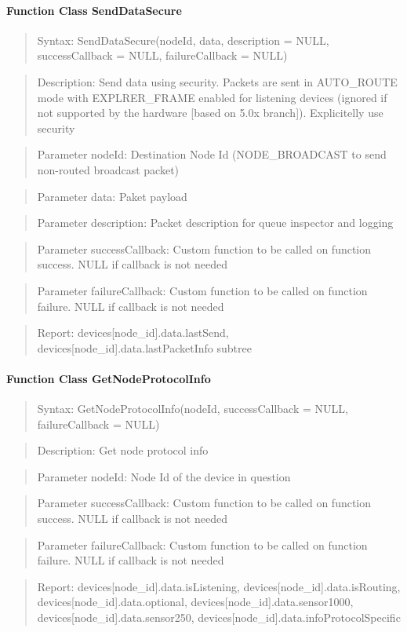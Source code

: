 \paragraph{Function Class SendDataSecure}
\begin{quote}Syntax: SendDataSecure(nodeId, data, description = NULL, successCallback = NULL, failureCallback = NULL)\end{quote}
\begin{quote}Description: Send data using security. Packets are sent in AUTO\_ROUTE mode with EXPLRER\_FRAME enabled for listening devices (ignored if not supported by the hardware [based on 5.0x branch]). Explicitelly use security\end{quote}
\begin{quote}Parameter nodeId: Destination Node Id (NODE\_BROADCAST to send non-routed broadcast packet)\end{quote}
\begin{quote}Parameter data: Paket payload\end{quote}
\begin{quote}Parameter description: Packet description for queue inspector and logging\end{quote}
\begin{quote}Parameter successCallback: Custom function to be called on function success. NULL if callback is not needed\end{quote}
\begin{quote}Parameter failureCallback: Custom function to be called on function failure. NULL if callback is not needed\end{quote}
\begin{quote}Report: devices[node\_id].data.lastSend, devices[node\_id].data.lastPacketInfo subtree\end{quote}

\paragraph{Function Class GetNodeProtocolInfo}
\begin{quote}Syntax: GetNodeProtocolInfo(nodeId, successCallback = NULL, failureCallback = NULL)\end{quote}
\begin{quote}Description: Get node protocol info\end{quote}
\begin{quote}Parameter nodeId: Node Id of the device in question\end{quote}
\begin{quote}Parameter successCallback: Custom function to be called on function success. NULL if callback is not needed\end{quote}
\begin{quote}Parameter failureCallback: Custom function to be called on function failure. NULL if callback is not needed\end{quote}
\begin{quote}Report: devices[node\_id].data.isListening, devices[node\_id].data.isRouting, devices[node\_id].data.optional, devices[node\_id].data.sensor1000, devices[node\_id].data.sensor250, devices[node\_id].data.infoProtocolSpecific\end{quote}

